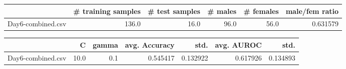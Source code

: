 \begin{tabular}{lrrrrr}
\hline
{} &  \# training samples &  \# test samples &  \# males &  \# females &  male/fem ratio \\
\hline
Day6-combined.csv &               136.0 &            16.0 &     96.0 &       56.0 &        0.631579 \\
\hline
\end{tabular}
\begin{tabular}{lrrrrrr}
\hline
{} &     C &  gamma &  avg. Accuracy &      std. &  avg. AUROC &      std. \\
\hline
Day6-combined.csv &  10.0 &    0.1 &       0.545417 &  0.132922 &    0.617926 &  0.134893 \\
\hline
\end{tabular}
